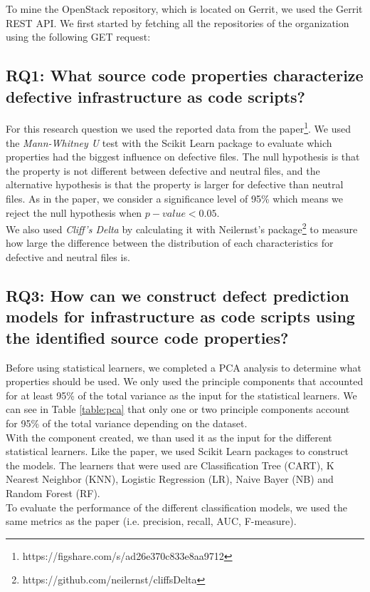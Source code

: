 To mine the OpenStack repository, which is located on Gerrit, we used the Gerrit REST API. We first started by fetching all the repositories of the organization using the following GET request:

\subsection{RQ1: What source code properties characterize defective infrastructure as code scripts?}
For this research question we used the reported data from the
paper\footnote{https://figshare.com/s/ad26e370c833e8aa9712}.
We used the \emph{Mann-Whitney U} test with the Scikit Learn package
to evaluate which properties had the biggest influence on defective files.
The null hypothesis is that the property is not different between defective and
neutral files, and the alternative hypothesis is that the property is larger for
defective than neutral files. As in the paper, we consider a significance level of
95\% which means we reject the null hypothesis when $ p-value < 0.05 $. \\

We also used \emph{Cliff's Delta} by calculating it with Neilernst's package\footnote{https://github.com/neilernst/cliffsDelta}
to measure how large the difference between the distribution of each characteristics
for defective and neutral files is.

\subsection{RQ3: How can we construct defect prediction models for 
infrastructure as code scripts using the identified source code properties?}
Before using statistical learners, we completed a PCA analysis to determine 
what properties should be used. We only used the principle components that accounted
for at least 95\% of the total variance as the input for the statistical learners.
We can see in Table \ref{table:pca} that only one or two principle components
account for 95\% of the total variance depending on the dataset. \\

With the component created, we than used it as the input for the different
statistical learners. Like the paper, we used Scikit Learn packages to construct
the models. The learners that were used are Classification Tree (CART),
K Nearest Neighbor (KNN), Logistic Regression (LR), Naive Bayer (NB) and
Random Forest (RF). \\

To evaluate the performance of the different classification models, we used the
same metrics as the paper (i.e. precision, recall, AUC, F-measure).
